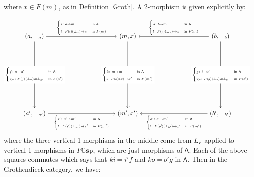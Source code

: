 \documentclass[oneside,final]{ucr}
\theoremstyle{definition}
\newcommand{\A}{\mathsf{A}}
\begin{document}
{where $x \in F(m)$, as in Definition \ref{Groth}. A 2-morphism is given explicitly by:

\begin{displaymath}\label{SC2morph}
 \begin{tikzcd}[sep=1.5in,ampersand replacement=\&]
 (a,\bot_a)\ar[r,"{\scalebox{0.8}{${\begin{cases}i\colon a\to m &\textrm{in }\A \\!\colon F(i)(\bot_a)\to x &\textrm{in }F(m)\end{cases}}$}}"]\ar[d,"{\scalebox{0.8}{${\begin{cases}f\colon a\to a' &\textrm{in }\A \\\chi_a\colon F(f)(\bot_a)\cong \bot_{a'} &\textrm{in }F(a')\end{cases}}$}}"description] \& (m,x) \ar[d,"{\scalebox{0.8}{${\begin{cases}k\colon m\to m' &\textrm{in }\A \\ \iota\colon F(k)(x)\to x' &\textrm{in }F(m')\end{cases}}$}}"description] \& (b,\bot_b)\ar[l,"{\scalebox{0.8}{${\begin{cases}o\colon b\to m &\textrm{in }\A \\!\colon F(o)(\bot_b)\to x &\textrm{in }F(m)\end{cases}}$}}"']\ar[d,"{\scalebox{0.8}{${\begin{cases}g\colon b\to b' &\textrm{in }\A \\\chi_b\colon F(g)(\bot_b)\cong \bot_{b'} &\textrm{in }F(b')\end{cases}}$}}"description] \\
 (a',\bot_{a'})\ar[r,"{\scalebox{0.8}{${\begin{cases}i'\colon a'\to m' &\textrm{in }\A \\!\colon F(i')(\bot_{a'})\to x' &\textrm{in }F(m')\end{cases}}$}}"'] \& (m',x') \& (b',\bot_{b'})\ar[l,"{\scalebox{0.8}{${\begin{cases}o'\colon b'\to m' &\textrm{in }\A \\!\colon F(o')(\bot_{b'})\to x' &\textrm{in }F(m')\end{cases}}$}}"]
 \end{tikzcd}
\end{displaymath}
where the three vertical 1-morphisms in the middle come from $L_F$ applied to vertical 1-morphisms in $F\mathbb{C}\mathbf{sp}$, which are just morphisms of $\mathsf{A}$. Each of the above squares commutes which says that $ki=i'f$ and $ko=o'g$ in $\mathsf{A}$. Then in the Grothendieck category, we have:
}
\end{document}
